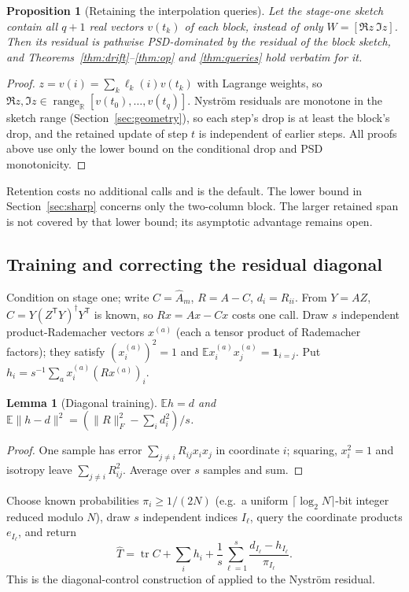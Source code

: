 \documentclass[11pt,a4paper]{article}
\newtheorem{lemma}[theorem]{Lemma}
\newtheorem{proposition}[theorem]{Proposition}
\theoremstyle{definition}\newtheorem{definition}[theorem]{Definition}
\theoremstyle{remark}\newtheorem{remark}[theorem]{Remark}
\numberwithin{equation}{section}
\newcommand{\E}{\mathbb E}
\newcommand{\R}{\mathbb R}
\newcommand{\tr}{\operatorname{tr}}
\newcommand{\range}{\operatorname{range}}
\newcommand{\norm}[1]{\lVert#1\rVert}
\begin{document}
\begin{proposition}[Retaining the interpolation queries]\label{prop:retain}
Let the stage-one sketch contain all $q+1$ real vectors $v(t_k)$ of each block,
instead of only $W=[\Re z\ \Im z]$. Then its residual is pathwise PSD-dominated
by the residual of the block sketch, and Theorems~\ref{thm:drift}--\ref{thm:op}
and \ref{thm:queries} hold verbatim for it.
\end{proposition}
\begin{proof}
$z=v(i)=\sum_k\ell_k(i)v(t_k)$ with Lagrange weights, so $\Re z,\Im z\in\range_{\R}[v(t_0),\ldots,v(t_q)]$.
Nystr\"om residuals are monotone in the sketch range (Section~\ref{sec:geometry}),
so each step's drop is at least the block's drop, and the retained update of
step $t$ is independent of earlier steps. All proofs above use only the lower
bound on the conditional drop and PSD monotonicity.
\end{proof}
Retention costs no additional calls and is the default.
The lower bound in Section~\ref{sec:sharp} concerns only the two-column block.
The larger retained span is not covered by that lower bound; its asymptotic
advantage remains open.

\subsection{Training and correcting the residual diagonal}
Condition on stage one; write $C=\widehat A_m$, $R=A-C$, $d_i=R_{ii}$. From
$Y=AZ$, $C=Y(Z^{\mathsf T}Y)^\dagger Y^{\mathsf T}$ is known, so $Rx=Ax-Cx$ costs one call.
Draw $s$ independent product-Rademacher vectors $x^{(a)}$ (each a tensor
product of Rademacher factors); they satisfy $(x^{(a)}_i)^2=1$ and
$\E x^{(a)}_ix^{(a)}_j=\mathbf 1_{i=j}$. Put
$h_i=s^{-1}\sum_ax^{(a)}_i(Rx^{(a)})_i$.

\begin{lemma}[Diagonal training]\label{lem:diagonal}
$\E h=d$ and $\E\norm{h-d}^2=(\norm R_F^2-\sum_id_i^2)/s$.
\end{lemma}
\begin{proof}
One sample has error $\sum_{j\ne i}R_{ij}x_ix_j$ in coordinate $i$; squaring,
$x_i^2=1$ and isotropy leave $\sum_{j\ne i}R_{ij}^2$. Average over $s$ samples and sum.
\end{proof}

Choose known probabilities $\pi_i\ge1/(2N)$ (e.g.\ a uniform
$\lceil\log_2N\rceil$-bit integer reduced modulo $N$), draw $s$ independent indices
$I_\ell$, query the coordinate products $e_{I_\ell}$, and return
\begin{equation}\label{eq:estimator}
 \widehat T=\tr C+\sum_ih_i+\frac1s\sum_{\ell=1}^s\frac{d_{I_\ell}-h_{I_\ell}}{\pi_{I_\ell}}.
\end{equation}
This is the diagonal-control construction of \cite[Section~7]{Holden} applied
to the Nystr\"om residual.
\end{document}
